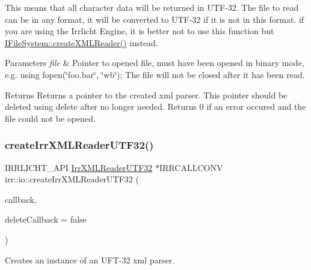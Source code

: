 This means that all character data will be returned in U\+T\+F-\/32. The file to read can be in any format, it will be converted to U\+T\+F-\/32 if it is not in this format. if you are using the Irrlicht Engine, it is better not to use this function but \hyperlink{classirr_1_1io_1_1IFileSystem_a167c9fa159d16ee5c56c074636b0865e}{I\+File\+System\+::create\+X\+M\+L\+Reader()} instead. 
\begin{DoxyParams}{Parameters}
{\em file} & Pointer to opened file, must have been opened in binary mode, e.\+g. using fopen(\char`\"{}foo.\+bar\char`\"{}, \char`\"{}wb\char`\"{}); The file will not be closed after it has been read. \\
\hline
\end{DoxyParams}
\begin{DoxyReturn}{Returns}
Returns a pointer to the created xml parser. This pointer should be deleted using \textquotesingle{}delete\textquotesingle{} after no longer needed. Returns 0 if an error occured and the file could not be opened. 
\end{DoxyReturn}
\mbox{\label{namespaceirr_1_1io_af26624a677d2662df81b57e2b0fda6de}} 
\subsubsection{\texorpdfstring{create\+Irr\+X\+M\+L\+Reader\+U\+T\+F32()}{createIrrXMLReaderUTF32()}\hspace{0.1cm}{\footnotesize\ttfamily [3/3]}}
{\footnotesize\ttfamily I\+R\+R\+L\+I\+C\+H\+T\+\_\+\+A\+PI \hyperlink{namespaceirr_1_1io_aa596f324a302585d965b1a28c562561b}{Irr\+X\+M\+L\+Reader\+U\+T\+F32} $\ast$I\+R\+R\+C\+A\+L\+L\+C\+O\+NV irr\+::io\+::create\+Irr\+X\+M\+L\+Reader\+U\+T\+F32 (\begin{DoxyParamCaption}\item[{\hyperlink{classirr_1_1io_1_1IFileReadCallBack}{I\+File\+Read\+Call\+Back} $\ast$}]{callback,  }\item[{bool}]{delete\+Callback = {\ttfamily false} }\end{DoxyParamCaption})}



Creates an instance of an U\+F\+T-\/32 xml parser. 

